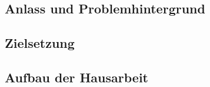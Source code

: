 \setcounter{pageAussen}{\value{page}}

\subsection{Anlass und Problemhintergrund}

\subsection{Zielsetzung}

\subsection{Aufbau der Hausarbeit}

\newpage